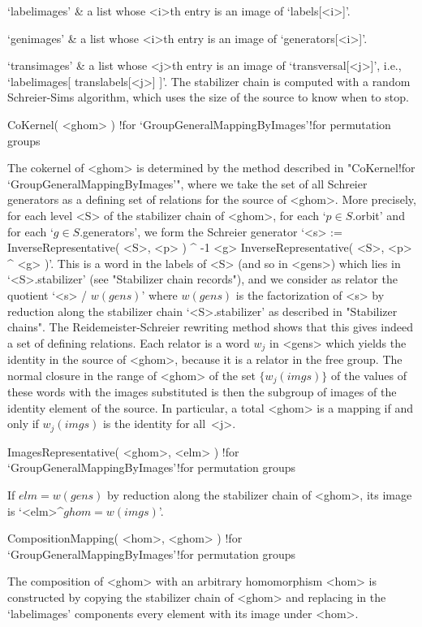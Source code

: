 `labelimages' &
        a list whose <i>th entry is an image of `labels[<i>]'.

`genimages' &
        a list whose <i>th entry is an image of `generators[<i>]'.

`transimages' &
        a list whose <j>th entry is an image of `transversal[<j>]', i.e.,
        `labelimages[ translabels[<j>] ]'.
\enditems
The stabilizer  chain is computed with  a random Schreier-Sims algorithm,
which uses the size of the source to know when to stop.

\>CoKernel( <ghom> )%
  !{for `GroupGeneralMappingByImages'!for permutation groups}

The  cokernel  of   <ghom> is determined   by   the method   described in
"CoKernel!for `GroupGeneralMappingByImages'",  where  we take the  set of
all Schreier generators as a defining set of relations  for the source of
<ghom>. More  precisely, for each  level  <S> of the  stabilizer chain of
<ghom>, for each `$p\in S$.orbit'  and for each `$g\in S$.generators', we
form the  Schreier generator `<s>  := InverseRepresentative( <S>, <p> ) ^
-1 \* <g> \* InverseRepresentative( <S>, <p> ^ <g> )'. This  is a word in
the labels of <S> (and so in <gens>) which  lies in `<S>.stabilizer' (see
"Stabilizer chain records"), and we consider as relator the quotient `<s>
/ $w(gens)$' where $w(gens)$  is  the factorization  of <s> by  reduction
along the  stabilizer chain `<S>.stabilizer'  as described in "Stabilizer
chains". The Reidemeister-Schreier rewriting method shows that this gives
indeed a set  of  defining relations. Each  relator is  a word $w_j$   in
<gens> which yields the identity in the source of <ghom>, because it is a
relator in the free  group. The normal closure in  the range of <ghom> of
the set  $\{w_j(imgs)\}$ of  the  values of these  words  with the images
substituted is then the subgroup of images of the identity element of the
source.  In particular,  a  total  <ghom> is  a   mapping if  and only if
$w_j(imgs)$ is the identity for all~<j>.

\>ImagesRepresentative( <ghom>, <elm> )%
  !{for `GroupGeneralMappingByImages'!for permutation groups}

If $elm=w(gens)$  by reduction along  the stabilizer chain of <ghom>, its
image is `<elm>^$ghom=w(imgs)$'.

\>CompositionMapping( <hom>, <ghom> )%
  !{for `GroupGeneralMappingByImages'!for permutation groups}

The  composition  of  <ghom>  with   an arbitrary homomorphism   <hom> is
constructed  by copying the  stabilizer chain of  <ghom> and replacing in
the `labelimages' components every element with its image under <hom>.

